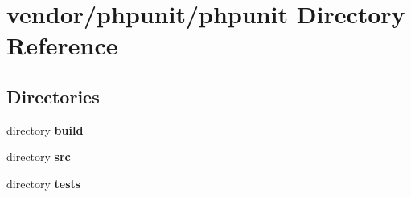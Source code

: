 \section{vendor/phpunit/phpunit Directory Reference}
\label{dir_83a5b24a14bfc70198bcd630714f46e4}
\subsection*{Directories}
\begin{DoxyCompactItemize}
\item 
directory {\bf build}
\item 
directory {\bf src}
\item 
directory {\bf tests}
\end{DoxyCompactItemize}
